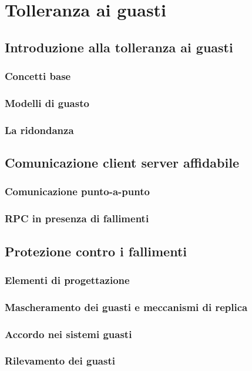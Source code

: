 \section{Tolleranza ai guasti}\label{capitolo8}
\subsection{Introduzione alla tolleranza ai guasti}
\subsubsection{Concetti base}
\subsubsection{Modelli di guasto}
\subsubsection{La ridondanza}
\subsection{Comunicazione client server affidabile}
\subsubsection{Comunicazione punto-a-punto}
\subsubsection{RPC in presenza di fallimenti}
\subsection{Protezione contro i fallimenti}
\subsubsection{Elementi di progettazione}
\subsubsection{Mascheramento dei guasti e meccanismi di replica}
\subsubsection{Accordo nei sistemi guasti}
\subsubsection{Rilevamento dei guasti}

